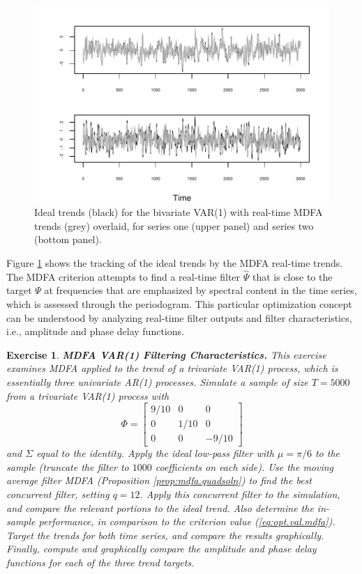 \documentclass[a4paper]{book}
\newtheorem{Exercise}{Exercise}
\begin{document}
\begin{figure}[htb!]
\begin{center}
\includegraphics[]{mdfa_var1_filtering.pdf}
\caption{Ideal trends (black) for the bivariate VAR(1)
	with real-time MDFA trends (grey) overlaid, for series one (upper panel)
	and series two (bottom panel).}
\label{fig:var1.trends}
\end{center}
\end{figure}

 Figure \ref{fig:var1.trends} shows the tracking of the ideal trends
 by the MDFA real-time trends.
The MDFA criterion  attempts to find a real-time filter $\widehat{\Psi}$
 that is close to the target $\Psi$ at frequencies that are emphasized
 by spectral content in the time series, which is assessed
 through the periodogram.   This particular 
optimization concept can be understood 
  by analyzing real-time filter outputs and filter 
  characteristics, i.e., amplitude and phase delay functions.


\begin{Exercise} {\bf MDFA VAR(1) Filtering Characteristics.} \rm
\label{exer:var1mdfa2.filter}
 This exercise examines MDFA applied to the trend of a trivariate VAR(1) process,
 which is essentially three univariate AR(1) processes.
Simulate a sample of size $T=5000$ from a
 trivariate VAR(1) process with 
\[
  \Phi = \left[ \begin{array}{ccc} 9/10 & 0 & 0 \\  0 & 1/10 & 0  \\ 0 & 0 & -9/10
   \end{array} \right]
\]
 and $\Sigma$ equal to the identity.   
  Apply the   ideal low-pass filter  with 
  $\mu = \pi/6$ to the sample (truncate the filter to $1000$ coefficients on each side).  
 Use the moving average filter
 MDFA  (Proposition \ref{prop:mdfa.quadsoln}) to find the best
 concurrent filter, setting $q= 12$.  Apply this concurrent filter 
 to the simulation, and compare the relevant portions to the ideal trend.
Also determine the in-sample performance, in comparison to the criterion value
 (\ref{eq:opt.val.mdfa}).
  Target the trends for both time series, and compare the results graphically.
 Finally, compute and graphically compare  the amplitude and phase delay
   functions for each of the three trend targets.
\end{Exercise}
\end{document}
